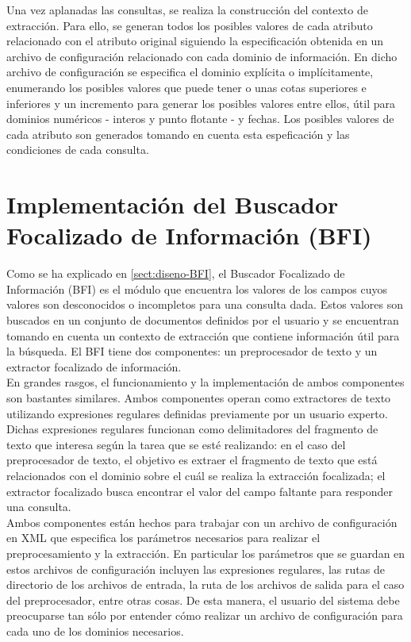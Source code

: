 Una vez aplanadas las consultas, se realiza la construcción del contexto de extracción. Para ello, se generan todos los posibles valores de cada atributo relacionado con el atributo original siguiendo la especificación obtenida en un archivo de configuración relacionado con cada dominio de información. En dicho archivo de configuración se especifica el dominio explícita o implícitamente, enumerando los posibles valores que puede tener o unas cotas superiores e inferiores y un incremento para generar los posibles valores entre ellos, útil para dominios numéricos - interos y punto flotante - y fechas. Los posibles valores de cada atributo son generados tomando en cuenta esta espeficación y las condiciones de cada consulta.  \\

\section{Implementación del Buscador Focalizado de Información (BFI)}\label{sect:implementacion-BFI}

Como se ha explicado en \ref{sect:diseno-BFI}, el Buscador Focalizado de Información (BFI) es el módulo que encuentra los valores de los campos cuyos valores son desconocidos o incompletos para una consulta dada. Estos valores son buscados en un conjunto de documentos definidos por el usuario y se encuentran tomando en cuenta un contexto de extracción que contiene información útil para la búsqueda. El BFI tiene dos componentes: un preprocesador de texto y un extractor focalizado de información. \\

En grandes rasgos, el funcionamiento y la implementación de ambos componentes son bastantes similares. Ambos componentes operan como extractores de texto utilizando expresiones regulares definidas previamente por un usuario experto. Dichas expresiones regulares funcionan como delimitadores del fragmento de texto que interesa según la tarea que se esté realizando: en el caso del preprocesador de texto, el objetivo es extraer el fragmento de texto que está relacionados con el dominio sobre el cuál se realiza la extracción focalizada; el extractor focalizado busca encontrar el valor del campo faltante para responder una consulta. \\

Ambos componentes están hechos para trabajar con un archivo de configuración en XML que especifica los parámetros necesarios para realizar el preprocesamiento y la extracción. En particular los parámetros que se guardan en estos archivos de configuración incluyen las expresiones regulares, las rutas de directorio de los archivos de entrada, la ruta de los archivos de salida para el caso del preprocesador, entre otras cosas. De esta manera, el usuario del sistema debe preocuparse tan sólo por entender cómo realizar un archivo de configuración para cada uno de los dominios necesarios. \\

